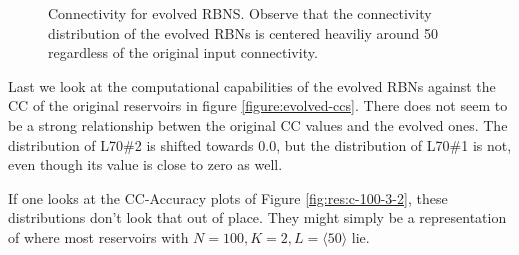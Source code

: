 \begin{figure}
  \centering
  \caption{
    Connectivity for evolved RBNS.
    Observe that the connectivity distribution of the evolved RBNs is centered heaviliy around 50 regardless of the original input connectivity.
  }
  \label{figure:evolved-connectivity}
\end{figure}

Last we look at the computational capabilities of the evolved RBNs against the CC of the original reservoirs in figure \ref{figure:evolved-ccs}.
There does not seem to be a strong relationship betwen the original CC values and the evolved ones.
The distribution of L70\#2 is shifted towards 0.0,
but the distribution of L70\#1 is not,
even though its value is close to zero as well.

If one looks at the CC-Accuracy plots of Figure \ref{fig:res:c-100-3-2},
these distributions don't look that out of place.
They might simply be a representation of where most reservoirs with
$N=100, K=2, L=\langle 50 \rangle$ lie.

